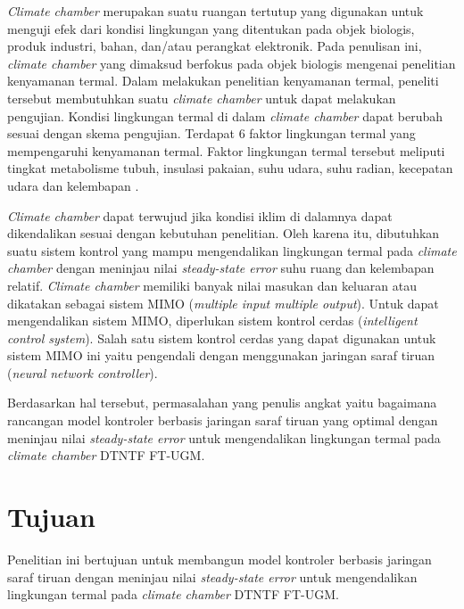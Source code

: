 \textit{Climate chamber} merupakan suatu ruangan tertutup yang digunakan untuk menguji efek dari kondisi lingkungan yang ditentukan pada objek biologis, produk industri, bahan, dan/atau perangkat elektronik. Pada penulisan ini, \textit{climate chamber} yang dimaksud berfokus pada objek biologis mengenai penelitian kenyamanan termal. Dalam melakukan penelitian kenyamanan termal, peneliti tersebut membutuhkan suatu \textit{climate chamber} untuk dapat melakukan pengujian. Kondisi lingkungan termal di dalam \textit{climate chamber} dapat berubah sesuai dengan skema pengujian. Terdapat 6 faktor lingkungan termal yang mempengaruhi kenyamanan termal. Faktor lingkungan termal tersebut meliputi tingkat metabolisme tubuh, insulasi pakaian, suhu udara, suhu radian, kecepatan udara dan kelembapan \cite{ASHRAE55}.

\textit{Climate chamber} dapat terwujud jika kondisi iklim di dalamnya dapat dikendalikan sesuai dengan kebutuhan penelitian. Oleh karena itu, dibutuhkan suatu sistem kontrol yang mampu mengendalikan lingkungan termal pada \textit{climate chamber} dengan meninjau nilai \textit{steady-state error} suhu ruang dan kelembapan relatif. \textit{Climate chamber} memiliki banyak nilai masukan dan keluaran atau dikatakan sebagai sistem MIMO (\textit{multiple input multiple output}). Untuk dapat mengendalikan sistem MIMO, diperlukan sistem kontrol cerdas (\textit{intelligent control system}). Salah satu sistem kontrol cerdas yang dapat digunakan untuk sistem MIMO ini yaitu pengendali dengan menggunakan jaringan saraf tiruan (\textit{neural network controller}).


Berdasarkan hal tersebut, permasalahan yang penulis angkat yaitu bagaimana rancangan model kontroler berbasis jaringan saraf tiruan yang optimal dengan meninjau nilai \textit{steady-state error} untuk mengendalikan lingkungan termal pada \textit{climate chamber} DTNTF FT-UGM.

\section{Tujuan}
Penelitian ini bertujuan untuk membangun model kontroler berbasis jaringan saraf tiruan dengan meninjau nilai \textit{steady-state error} untuk mengendalikan lingkungan termal pada \textit{climate chamber} DTNTF FT-UGM.


